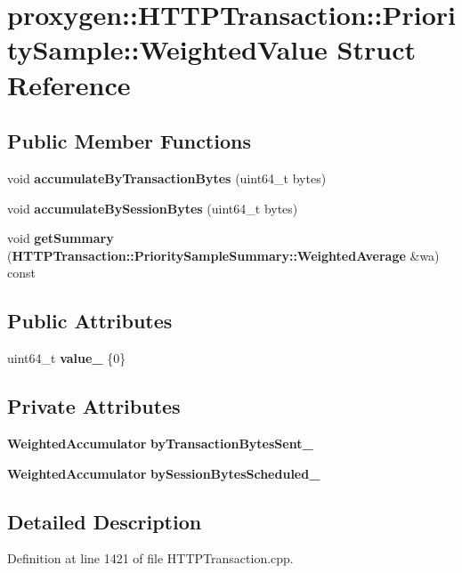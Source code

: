 \section{proxygen\+:\+:H\+T\+T\+P\+Transaction\+:\+:Priority\+Sample\+:\+:Weighted\+Value Struct Reference}
\label{structproxygen_1_1HTTPTransaction_1_1PrioritySample_1_1WeightedValue}
\subsection*{Public Member Functions}
\begin{DoxyCompactItemize}
\item 
void {\bf accumulate\+By\+Transaction\+Bytes} (uint64\+\_\+t bytes)
\item 
void {\bf accumulate\+By\+Session\+Bytes} (uint64\+\_\+t bytes)
\item 
void {\bf get\+Summary} ({\bf H\+T\+T\+P\+Transaction\+::\+Priority\+Sample\+Summary\+::\+Weighted\+Average} \&wa) const 
\end{DoxyCompactItemize}
\subsection*{Public Attributes}
\begin{DoxyCompactItemize}
\item 
uint64\+\_\+t {\bf value\+\_\+} \{0\}
\end{DoxyCompactItemize}
\subsection*{Private Attributes}
\begin{DoxyCompactItemize}
\item 
{\bf Weighted\+Accumulator} {\bf by\+Transaction\+Bytes\+Sent\+\_\+}
\item 
{\bf Weighted\+Accumulator} {\bf by\+Session\+Bytes\+Scheduled\+\_\+}
\end{DoxyCompactItemize}


\subsection{Detailed Description}


Definition at line 1421 of file H\+T\+T\+P\+Transaction.\+cpp.



